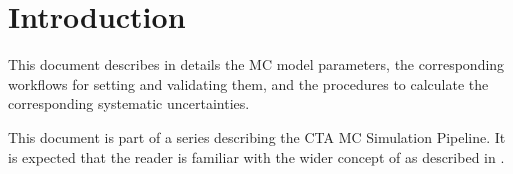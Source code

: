 \section{Introduction}

This document describes in details the MC model parameters, the corresponding workflows for setting and validating them, and the procedures to calculate the corresponding systematic uncertainties.

This document is part of a series describing the CTA MC Simulation Pipeline. 
It is expected that the reader is familiar with the wider concept of \simsys as described in  \cite{CTAConcept}.


